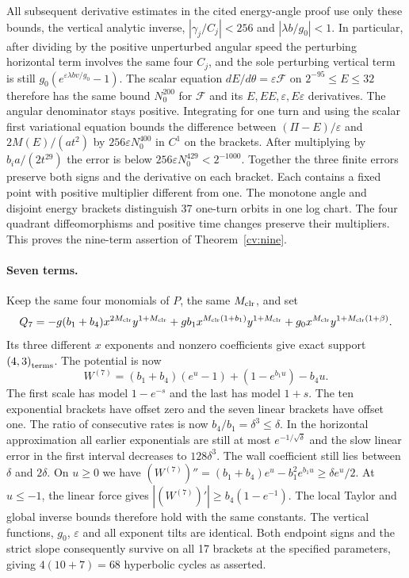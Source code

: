 All subsequent derivative estimates in the cited energy-angle proof
use only these bounds, the vertical analytic inverse,
$|\gamma_j/C_j|<256$ and $|\lambda b/g_0|<1$. In particular, after
dividing by the positive unperturbed angular speed the perturbing
horizontal term involves the same four $C_j$, and the sole perturbing
vertical term is still $g_0(e^{\varepsilon\lambda bv/g_0}-1)$.
The scalar equation $dE/d\theta=\varepsilon\mathcal F$ on
$2^{-95}\le E\le32$ therefore has the same bound $N_0^{200}$ for
$\mathcal F$ and its $E,EE,\varepsilon,E\varepsilon$ derivatives.
The angular denominator stays positive. Integrating for one turn and
using the scalar first variational equation bounds the difference between
$(\Pi-E)/\varepsilon$ and $2M(E)/(at^2)$ by
$256\varepsilon N_0^{400}$ in $C^1$ on the brackets. After multiplying
by $b_i a/(2t^{29})$ the error is below $256\varepsilon N_0^{429}<2^{-1000}$.
Together the three finite errors preserve both signs and the derivative
on each bracket. Each contains a fixed point with positive multiplier
different from one. The monotone angle and disjoint energy brackets
distinguish 37 one-turn orbits in one log chart. The four quadrant
diffeomorphisms and positive time changes preserve their multipliers.
This proves the nine-term assertion of Theorem~\ref{cv:nine}.

\paragraph{Seven terms.}
Keep the same four monomials of $P$, the same $M_{\mathrm{clr}}{}$, and set
\[
 Q_7=-g(b_1+b_4)x^{2M_{\mathrm{clr}}{}}y^{1+M_{\mathrm{clr}}{}}
       +gb_1 x^{M_{\mathrm{clr}}{}(1+b_1)}y^{1+M_{\mathrm{clr}}{}}+g_0x^{M_{\mathrm{clr}}} y^{1+M_{\mathrm{clr}}{}(1+\beta)}.
\]
Its three different $x$ exponents and nonzero coefficients give exact support $\left(4,3\right)_{\mathrm{terms}}$. The potential is now
\[
 W^{(7)}=(b_1+b_4)(e^u-1)+(1-e^{b_1u})-b_4u.
\]
The first scale has model $1-e^{-s}$ and the last has model $1+s$. The ten exponential brackets have offset zero and the seven linear brackets have offset one. The ratio of consecutive rates is now $b_4/b_1=\delta^3\le\delta$. In the horizontal approximation all earlier exponentials are still at most $e^{-1/\sqrt\delta}$ and the slow linear error in the first interval decreases to $128\delta^3$. The wall coefficient still lies between $\delta$ and $2\delta$. On $u\ge0$ we have $(W^{(7)})''=(b_1+b_4)e^u-b_1^2 e^{b_1u}\ge\delta e^u/2$. At $u\le-1$, the linear force gives $|(W^{(7)})'|\ge b_4(1-e^{-1})$. The local Taylor and global inverse bounds therefore hold with the same constants. The vertical functions, $g_0$, $\varepsilon$ and all exponent tilts are identical. Both endpoint signs and the strict slope consequently survive on all 17 brackets at the specified parameters, giving $4(10+7)=68$ hyperbolic cycles as asserted.

